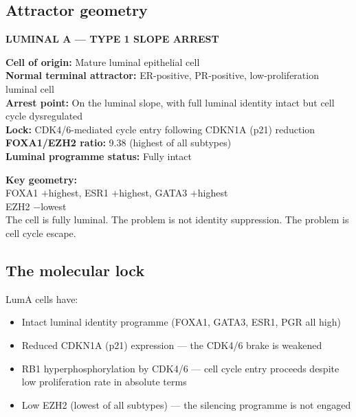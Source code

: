 \documentclass[12pt, a4paper]{article}
\begin{document}
\subsection{Attractor geometry}

\begin{center}
\colorbox{mechanismbox}{
\begin{minipage}{0.85\textwidth}
\vspace{0.5em}
\textbf{LUMINAL A --- TYPE 1 SLOPE ARREST}

\medskip
\textbf{Cell of origin:} Mature luminal epithelial cell\\
\textbf{Normal terminal attractor:} ER-positive,
PR-positive, low-proliferation luminal cell\\
\textbf{Arrest point:} On the luminal slope, with full
luminal identity intact but cell cycle dysregulated\\
\textbf{Lock:} CDK4/6-mediated cycle entry following
CDKN1A (p21) reduction\\
\textbf{FOXA1/EZH2 ratio:} 9.38 (highest of all subtypes)\\
\textbf{Luminal programme status:} Fully intact

\medskip
\textbf{Key geometry:}\\
FOXA1 $+$highest, ESR1 $+$highest, GATA3 $+$highest\\
EZH2 $-$lowest\\
The cell is fully luminal. The problem is not identity
suppression. The problem is cell cycle escape.
\vspace{0.5em}
\end{minipage}
}
\end{center}

\subsection{The molecular lock}

LumA cells have:
\begin{itemize}[noitemsep]
  \item Intact luminal identity programme (FOXA1, GATA3,
        ESR1, PGR all high)
  \item Reduced CDKN1A (p21) expression --- the
        CDK4/6 brake is weakened
  \item RB1 hyperphosphorylation by CDK4/6 ---
        cell cycle entry proceeds despite low proliferation
        rate in absolute terms
  \item Low EZH2 (lowest of all subtypes) ---
        the silencing programme is not engaged
\end{itemize}
\end{document}
